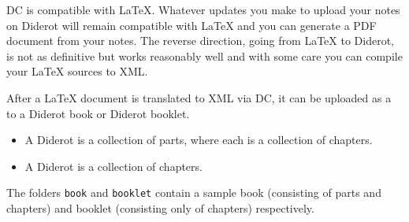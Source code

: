 DC is compatible with LaTeX. Whatever updates you make to upload your notes on Diderot will remain compatible with LaTeX and  you can generate a PDF document from your notes.
%
The reverse direction, going from LaTeX to Diderot, is not as
definitive but works reasonably well and with some care you can
compile your LaTeX sources to XML.
%


\begin{definition}
After a LaTeX document is translated to XML via DC, it can be uploaded as a  to a Diderot book or Diderot booklet.  
%

\begin{itemize}
\item
A Diderot  is a collection of parts, where each  is a collection of chapters.

\item
A Diderot  is a collection of chapters. 
\end{itemize}
\end{definition}

\begin{example}
The folders \lstinline`book` and \lstinline`booklet` contain a sample book (consisting of parts and chapters) and booklet (consisting only of chapters) respectively.
\end{example}






